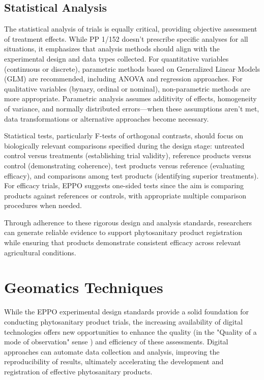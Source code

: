 \documentclass[12pt,a4paper,oneside]{report}
\begin{document}
\subsection{Statistical Analysis}

The statistical analysis of trials is equally critical, providing objective 
assessment of treatment effects. While PP 1/152 \cite{EPPO_PP1_152} doesn't prescribe 
specific analyses for all situations, it emphasizes that analysis methods should 
align with the experimental design and data types collected. For quantitative 
variables (continuous or discrete), parametric methods based on Generalized 
Linear Models (GLM) are recommended, including ANOVA and regression approaches. 
For qualitative variables (bynary, ordinal or nominal), non-parametric methods are more 
appropriate. Parametric analysis assumes additivity of effects, homogeneity of variance, 
and normally distributed errors—when these assumptions aren't met, data transformations 
or alternative approaches become necessary.

Statistical tests, particularly F-tests of orthogonal 
contrasts, should focus on biologically relevant comparisons specified during the 
design stage: untreated control versus treatments (establishing trial validity), 
reference products versus control (demonstrating coherence), test products versus 
reference (evaluating efficacy), and comparisons among test products (identifying 
superior treatments). For efficacy trials, EPPO suggests one-sided tests since the 
aim is comparing products against references or controls, with appropriate multiple 
comparison procedures when needed.

Through adherence to these rigorous design and analysis standards, researchers can 
generate reliable evidence to support phytosanitary product registration while ensuring 
that products demonstrate consistent efficacy across relevant agricultural conditions.

\section{Geomatics Techniques}

While the EPPO experimental design standards provide a solid foundation for conducting
phytosanitary product trials, the increasing availability of digital technologies
offers new opportunities to enhance the quality (in the "Quality of a mode of observation" sense \cite{EPPO_PP1_152}) 
and efficiency of these assessments.
Digital approaches can automate data collection and analysis, improving the
reproducibility of results, ultimately accelerating the development and registration of
effective phytosanitary products.
\end{document}
